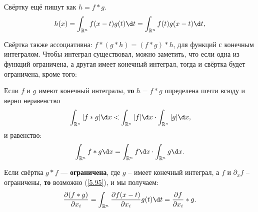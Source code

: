 \begin{to_def} Свёртку ещё пишут как $h = f * g$.
	\begin{equation*}
		h(x) = \int_{\mathbb{R}^n} f (x - t)g(t)\d t =\int_{\mathbb{R}^n} f(t)g(x-t) \d t,
	\end{equation*}
	\label{def_svertka}
\end{to_def}

Свёртка также ассоциативна: $f *(g*h) = (f*g)*h$, для функций с конечным интегралом.
Чтобы интеграл существовал, можно заметить, что если одна из функций ограничена, а другая имеет конечный интеграл, тогда и свёртка будет ограничена, кроме того:

\begin{to_thr}%
	Если $f$ и $g$ имеют конечный интегралы, \textbf{то} $h = f*g$ определена почти всюду и верно неравенс{}тво
	\begin{equation*}{}
		\int_{\mathbb{R}^n} |f * g| \d x < \int_{\mathbb{R}^n}|f| \d x \cdot \int_{\mathbb{R}^n}|g|\d x,
	\end{equation*}
	и равенство:
	\begin{equation*}
		\int_{\mathbb{R}^n} f * g \d x = \int_{\mathbb{R}^n} f \d x \cdot \int_{\mathbb{R}^n} g \d x.
	\end{equation*}
	\label{thr_6.18}
\end{to_thr}

\begin{to_lem}
	Если свёртка $g*f$ --- \textbf{ограничена}, где $g$ -- имеет конечный интеграл, а $f$ и $\partial_x f$ -- ограничены, \textbf{то} возможно  (\ref{5.95}), и мы получаем:
	\begin{equation*}
		\frac{\partial (f*g)}{\partial x_i} = \int_{\mathbb{R}^n} \frac{\partial f(x-t)}{\partial x_i} g(t) \d t = \frac{\partial f}{\partial x_i} * g.
	\end{equation*}
	\label{lem_6.19}
\end{to_lem}
